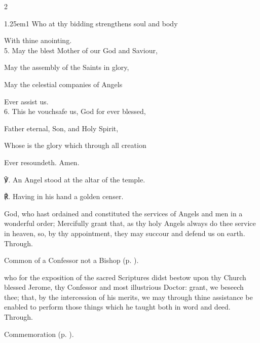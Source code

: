 \begin{paracol}{2}
\begin{hangparas}{1.25em}{1}
Who at thy bidding strengthens soul and body

With thine anointing.\\

5. May the blest Mother of our God and Saviour,

May the assembly of the Saints in glory,

May the celestial companies of Angels

Ever assist us.\\

6. This he vouchsafe us, God for ever blessed,

Father eternal, Son, and Holy Spirit,

Whose is the glory which through all creation

Ever resoundeth. Amen.\\
\end{hangparas}

℣. An Angel stood at the altar of the temple.

℟. Having in his hand a golden censer.


\fussy	
\end{paracol}


\collect
{} God, who hast ordained and constituted the services of Angels and men in a wonderful order; Mercifully grant that, as thy holy Angels always do thee service in heaven, so, by thy appointment, they may succour and defend us on earth. Through.



\begin{rubric}
	Common of a Confessor not a Bishop (p. \pageref{CommonConfessorNotBishop}).
\end{rubric}

{} who for the exposition of the sacred Scriptures didst bestow upon thy Church blessed Jerome, thy Confessor and most illustrious Doctor: grant, we beseech thee; that, by the intercession of his merits, we may through thine assistance be enabled to perform those things which he taught both in word and deed. Through.

\begin{rubric}
    Commemoration  (p. \pageref{ArmeniaCollect}).
\end{rubric}


